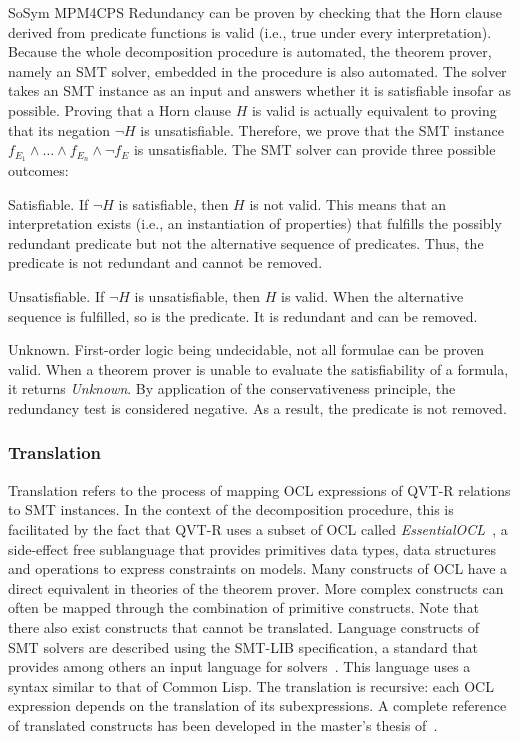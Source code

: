 \begin{copiedFrom}{SoSym MPM4CPS}
Redundancy can be proven by checking that the Horn clause derived from predicate functions is valid (i.e., true under every interpretation). Because the whole decomposition procedure is automated, the theorem prover, namely an SMT solver, embedded in the procedure is also automated. 
The solver takes an SMT instance as an input and answers whether it is satisfiable insofar as possible.
Proving that a Horn clause $H$ is valid is actually equivalent to proving that its negation $\neg H$ is unsatisfiable. Therefore, we prove that the SMT instance $f_{E_1} \wedge \dots \wedge f_{E_n} \wedge \neg f_{E}$ is unsatisfiable. The SMT solver can provide three possible outcomes:

\begin{properdescription}
    \item[Satisfiable.] If $\neg H$ is satisfiable, then $H$ is not valid. This means that an interpretation exists (i.e., an instantiation of properties) that fulfills the possibly redundant predicate but not the alternative sequence of predicates. Thus, the predicate is not redundant and cannot be removed.
    \item[Unsatisfiable.] If $\neg H$ is unsatisfiable, then $H$ is valid. When the alternative sequence is fulfilled, so is the predicate. It is redundant and can be removed.
    \item[Unknown.] First-order logic being undecidable, not all formulae can be proven valid. When a theorem prover is unable to evaluate the satisfiability of a formula, it returns \textit{Unknown}. By application of the conservativeness principle, the redundancy test is considered negative. As a result, the predicate is not removed.
\end{properdescription}

\subsubsection{Translation}

Translation refers to the process of mapping OCL expressions of QVT-R relations to SMT instances. In the context of the decomposition procedure, this is facilitated by the fact that QVT-R uses a subset of OCL called \textit{EssentialOCL}~\cite{qvt}, a side-effect free sublanguage that provides primitives data types, data structures and operations to express constraints on models. Many constructs of OCL have a direct equivalent in theories of the theorem prover. More complex constructs can often be mapped through the combination of primitive constructs. Note that there also exist constructs that cannot be translated. Language constructs of SMT solvers are described using the SMT-LIB specification, a standard that provides among others an input language for solvers~\cite{smtlib2017}. This language uses a syntax similar to that of Common Lisp. The translation is recursive: each OCL expression depends on the translation of its subexpressions. A complete reference of translated constructs has been developed in the master's thesis of~\textcite{pepin2019ma}.


\end{copiedFrom}
